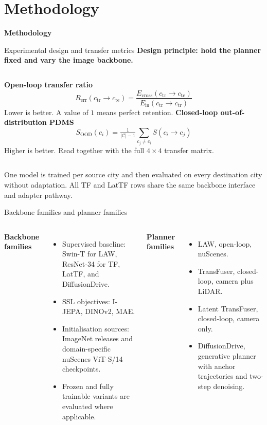 \documentclass[aspectratio=169, xcolor={table}]{beamer}
\newcommand{\sectiondivider}[1]{%
  \begin{frame}[plain]
    \centering
    \vfill
    {\LARGE \textbf{#1}\par}
    \vfill
  \end{frame}
}
\begin{document}
\section{Methodology}

\sectiondivider{Methodology}

\begin{frame}{Experimental design and transfer metrics}
  \textbf{Design principle: hold the planner fixed and vary the image backbone.}
  \smallskip
  \begin{columns}[T]
    \textbf{Open-loop transfer ratio}
    \[
      R_{\mathrm{err}}(c_{\mathrm{tr}}\!\to\!c_{\mathrm{te}})
      = \frac{E_{\mathrm{cross}}(c_{\mathrm{tr}}\!\to\!c_{\mathrm{te}})}{E_{\mathrm{in}}(c_{\mathrm{tr}}\!\to\!c_{\mathrm{tr}})}
    \]
    Lower is better. A value of $1$ means perfect retention.
    \textbf{Closed-loop out-of-distribution PDMS}
    \[
      S_{\mathrm{OOD}}(c_i)
      = \tfrac{1}{|\mathcal{C}|-1}\sum_{c_j\neq c_i} S(c_i{\to}c_j)
    \]
    Higher is better. Read together with the full $4\times4$ transfer matrix.
  \end{columns}
  \vspace{8pt}
  \footnotesize One model is trained per source city and then evaluated on every destination city without adaptation. All TF and LatTF rows share the same backbone interface and adapter pathway.
\end{frame}

\begin{frame}{Backbone families and planner families}
  \begin{columns}[T]
    \textbf{Backbone families}
    \begin{itemize}\footnotesize
      \item Supervised baseline: Swin-T for LAW, ResNet-34 for TF, LatTF, and DiffusionDrive.
      \item SSL objectives: I-JEPA, DINOv2, MAE.
      \item Initialisation sources: ImageNet releases and domain-specific nuScenes ViT-S/14 checkpoints.
      \item Frozen and fully trainable variants are evaluated where applicable.
    \end{itemize}
    \textbf{Planner families}
    \begin{itemize}\footnotesize
      \item LAW, open-loop, nuScenes.
      \item TransFuser, closed-loop, camera plus LiDAR.
      \item Latent TransFuser, closed-loop, camera only.
      \item DiffusionDrive, generative planner with anchor trajectories and two-step denoising.
    \end{itemize}
  \end{columns}
\end{frame}
\end{document}
